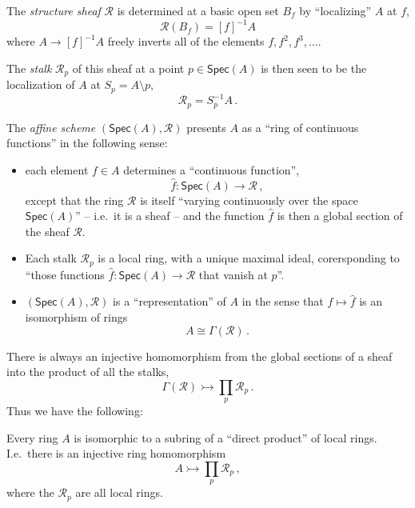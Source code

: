\documentclass[graybox]{svmult}
\newcommand{\myemph}[1]{\emph{#1}}
\begin{document}
The \myemph{structure sheaf} $\mathcal {R}$ is determined at a basic open set $B_f$ by ``localizing'' $A$ at $f$,
\[
\mathcal{R}(B_f) = [f]^{-1}A
\]
where $A \rightarrow [f]^{-1}A$ freely inverts all of the elements $f, f^2, f^3, \dots$.
\medskip

The \myemph{stalk} $\mathcal {R}_p$ of this sheaf at a point $p\in\mathsf{Spec}(A)$ is then seen to be the localization of $A$ at $S_p = A\setminus p$,
\[
\mathcal{R}_p = S^{-1}_p{A}\,.
\]


The \myemph{affine scheme} $(\mathsf{Spec}(A), \mathcal {R})$ presents $A$ as a ``ring of continuous functions'' in the following sense: 
\begin{itemize}
\item each element $f\in A$ determines a ``continuous function'',
\[
\hat{f} : \mathsf{Spec}(A) \to \mathcal {R}\,,
\]
except that the ring $\mathcal{R}$ is itself ``varying continuously over the space $\mathsf{Spec}(A)$'' -- i.e.\ it is a sheaf -- and the function $\hat{f}$ is then a global section of the sheaf $\mathcal{R}$.  

\item Each stalk $\mathcal{R}_p$ is a local ring, with a unique maximal ideal, corersponding to ``those functions  $\hat{f} : \mathsf{Spec}(A) \to \mathcal{R}$ that vanish at $p$''.

\item $(\mathsf{Spec}(A), \mathcal {R})$ is a ``representation'' of $A$ in the sense that $f\mapsto\hat{f}$ is an isomorphism of rings
\[
A \cong \Gamma(\mathcal{R})\,.
\]
\end{itemize}

There is always an injective homomorphism from the global sections of a sheaf into the product of all the stalks,
\[
\Gamma(\mathcal{R}) \rightarrowtail \prod_{p}\mathcal{R}_p \,.
\]
Thus we have the following:

\begin{corollary}
Every ring $A$ is isomorphic to a {sub}ring of a ``direct product'' of local rings.
I.e.\ there is an injective ring homomorphism
\[
A \rightarrowtail \prod_{p}\mathcal{R}_p \,,
\]
where the $\mathcal{R}_p$ are all local rings.
\end{corollary}
\end{document}
